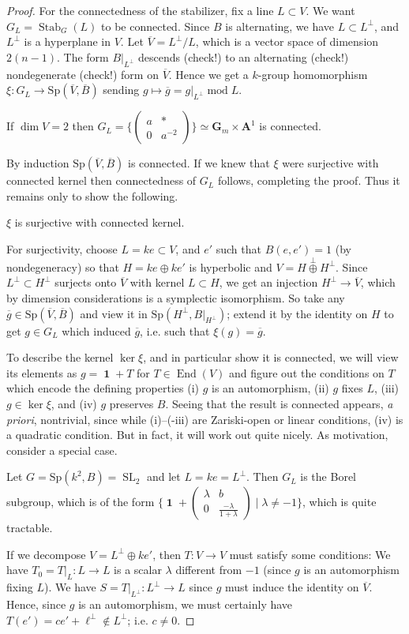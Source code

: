 \documentclass[10pt]{article}
\renewcommand{\AA}{\mathbf{A}}
\newcommand{\SL}{\operatorname{SL}}
\renewcommand{\(}{\left(}
\renewcommand{\)}{\right)}
\renewcommand{\bar}{\overline}
\newcommand{\End}{\operatorname{End}}
\DeclareMathOperator{\id}{\mathbf{1}}
\renewcommand{\mod}{\operatorname{mod}}
\newcommand{\Stab}{\operatorname{Stab}}
\newcommand{\Sp}{\mathrm{Sp}}
\numberwithin{thm}{subsection}
\begin{document}
\begin{proof}
For the connectedness of the stabilizer, fix a line $L\subset V$.
We want $G_L=\Stab_G(L)$ to be connected.
Since $B$ is alternating, we have $L\subset L^\perp$, and $L^\perp$ is a hyperplane in $V$. 
Let $\bar V = L^\perp/L$, which
is a vector space of dimension $2(n-1)$.
The form $B|_{L^\perp}$ descends (check!) to an alternating (check!)
nondegenerate (check!) form on $\bar V$.
Hence we get a $k$-group homomorphism $\xi:G_L\to \Sp(\bar V, \bar B)$
sending $g\mapsto \bar g =g |_{L^\perp}\mod L$.
\begin{rem}
If $\dim V = 2$ then $G_L=\{\(\begin{smallmatrix}a&*\\0&a^{-2}\end{smallmatrix}\)\}\simeq \mathbf{G}_m\times \AA^1$ is connected.
\end{rem}
By induction $\Sp(\bar V, \bar B)$ is connected.
If  we knew that $\xi$ were surjective with connected kernel then 
connectedness of $G_L$ follows, completing the proof. Thus it remains only
to show the following.
\begin{claim}$\xi$ is surjective with connected kernel.
\end{claim}
For surjectivity, choose $L=ke\subset V$,
and $e'$ such that $B(e,e')=1$ (by nondegeneracy)
so that $H=ke\oplus ke'$ is hyperbolic
and $V=H\stackrel{\perp}{\oplus}H^\perp$.
Since $L^\perp\subset H^\perp$
surjects onto $\bar V$ with kernel $L\subset H$,
we get an injection $H^\perp\to \bar V$, which by dimension considerations is
a symplectic isomorphism.
So take any $\bar g\in \Sp(\bar V, \bar B)$
and view it in $\Sp(H^\perp,B|_{H^\perp})$;
extend it by the identity on $H$ to get $g\in G_L$
which induced $\bar g$, i.e. such that $\xi(g)=\bar g$.

To describe the kernel $\ker\xi$, and in particular show it is connected, we will view its elements as $g=\id + T$ for $T\in \End(V)$
and figure out the conditions on $T$ which encode the defining properties
(i) $g$ is an automorphism, (ii) $g$ fixes $L$, (iii) $g\in \ker \xi$,
and (iv) $g$ preserves $B$.
Seeing that the result is connected appears, \textit{a priori}, nontrivial,
since while (i)--(-iii) are Zariski-open or linear conditions, 
(iv) is a quadratic condition.
But in fact, it will work out quite nicely.
As motivation, consider a special case.
\begin{ex}
Let $G=\Sp(k^2,B)=\SL_2$
and let $L= ke=L^\perp$.
Then $G_L$ is the Borel subgroup,
which is of the form $\{\id+\(\begin{smallmatrix}\lambda&b\\0&\frac{-\lambda}{1+\lambda}\end{smallmatrix}\)\mid \lambda\neq -1\}$, which is quite tractable.
\end{ex}
If we decompose $V=L^\perp\oplus ke'$,
then $T:V\to V$ must satisfy some conditions:
We have $T_0=T|_L:L\to L$ is a scalar $\lambda$ different from $-1$ (since $g$ is an automorphism fixing $L$).
We have $S=T|_{L^\perp}:L^\perp\to L$ since $g$ must induce the identity on $\bar V$.
Hence, since $g$ is an automorphism, we must certainly have $T(e')=ce'+\ell^\perp\not\in L^\perp$; i.e. $c\neq 0$.


\end{proof}
\end{document}
